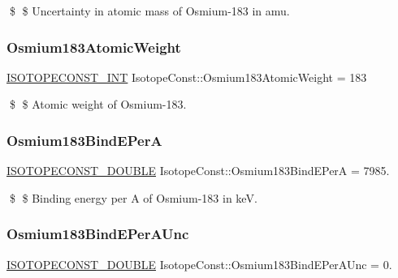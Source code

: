 \$ \$ Uncertainty in atomic mass of Osmium-\/183 in amu. \mbox{\label{group___isotope_const-_osmium-_os183_ga2e06f0d54ea7c839d66f6bc961fa50b3}} 
\subsubsection{\texorpdfstring{Osmium183\+Atomic\+Weight}{Osmium183AtomicWeight}}
{\footnotesize\ttfamily \mbox{\hyperlink{group___isotope_const-_macros_ga5f18360b3e99483a35c32d789e62621c}{I\+S\+O\+T\+O\+P\+E\+C\+O\+N\+S\+T\+\_\+\+I\+NT}} Isotope\+Const\+::\+Osmium183\+Atomic\+Weight = 183}

\$ \$ Atomic weight of Osmium-\/183. \mbox{\label{group___isotope_const-_osmium-_os183_gae574f6bf77f96f7d864eb8360b79df8c}} 
\subsubsection{\texorpdfstring{Osmium183\+Bind\+E\+PerA}{Osmium183BindEPerA}}
{\footnotesize\ttfamily \mbox{\hyperlink{group___isotope_const-_macros_ga8f45a7272ce02c0b4c65c44636ed719a}{I\+S\+O\+T\+O\+P\+E\+C\+O\+N\+S\+T\+\_\+\+D\+O\+U\+B\+LE}} Isotope\+Const\+::\+Osmium183\+Bind\+E\+PerA = 7985.}

\$ \$ Binding energy per A of Osmium-\/183 in keV. \mbox{\label{group___isotope_const-_osmium-_os183_ga9fe933a09b746599b5e0532041d54391}} 
\subsubsection{\texorpdfstring{Osmium183\+Bind\+E\+Per\+A\+Unc}{Osmium183BindEPerAUnc}}
{\footnotesize\ttfamily \mbox{\hyperlink{group___isotope_const-_macros_ga8f45a7272ce02c0b4c65c44636ed719a}{I\+S\+O\+T\+O\+P\+E\+C\+O\+N\+S\+T\+\_\+\+D\+O\+U\+B\+LE}} Isotope\+Const\+::\+Osmium183\+Bind\+E\+Per\+A\+Unc = 0.}

